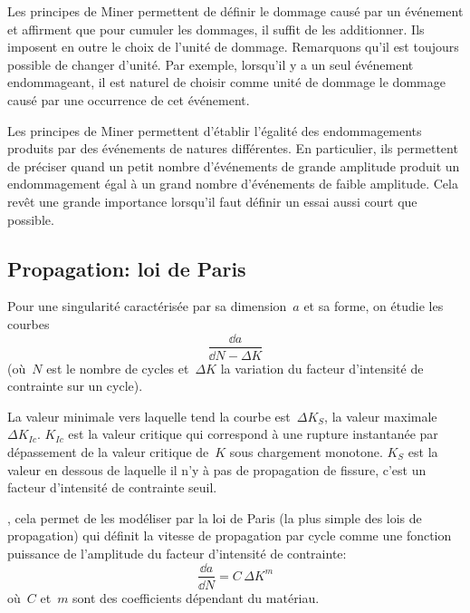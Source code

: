 \medskip
Les principes de Miner permettent de définir le dommage causé par un événement
et affirment que pour cumuler les dommages, il suffit de les additionner.
Ils imposent en outre le choix de l'unité
de dommage. Remarquons qu'il est toujours possible de changer d'unité. Par exemple, lorsqu'il y a
un seul événement endommageant, il est naturel de choisir comme unité de dommage le dommage
causé par une occurrence de cet événement.

\medskip
Les principes de Miner permettent d'établir l'égalité des endommagements produits par des
événements de natures différentes. En particulier, ils permettent de préciser quand un petit nombre
d'événements de grande amplitude produit un endommagement égal à un grand nombre
d'événements de faible amplitude. Cela revêt une grande importance lorsqu'il faut définir
un essai aussi court que possible.



\medskip
\subsection{Propagation: loi de Paris}

\medskip
Pour une singularité caractérisée par sa dimension~$a$ et sa forme, on étudie les courbes
\begin{equation}\frac{\dd a}{\dd N - \Delta K}\end{equation} (où~$N$ est le nombre de cycles et~$\Delta K$ la variation du facteur
d'intensité de contrainte sur un cycle).

\medskip
{}
La valeur minimale vers laquelle tend la courbe est~$\Delta K_S$, la valeur maximale~$\Delta K_{Ic}$.
$K_{Ic}$ est la valeur critique qui correspond à une rupture instantanée par dépassement de la
valeur critique de~$K$ sous chargement monotone.
$K_S$ est la valeur en dessous de laquelle il n'y à pas de propagation de fissure, c'est un
facteur d'intensité de contrainte seuil.

\medskip
{}, cela permet de les
modéliser par la loi de Paris (la plus simple des lois de propagation) qui définit la vitesse de
propagation par cycle comme une fonction puissance de l'amplitude du facteur d'intensité de
contrainte:
\begin{equation} \dfrac{\dd a}{\dd N} = C\,\Delta K^m \end{equation}
où~$C$ et~$m$ sont des coefficients dépendant du matériau.

